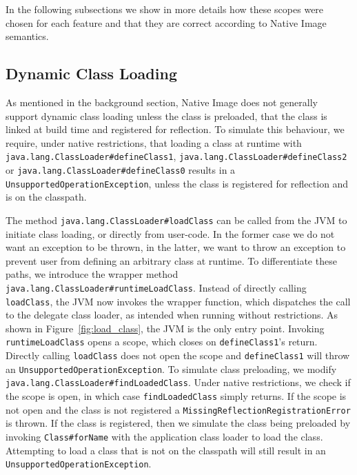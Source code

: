 In the following subsections we show in more details how these scopes were chosen for each feature and that they are correct according to Native Image semantics.

\subsection{Dynamic Class Loading}
As mentioned in the background section, Native Image does not generally support dynamic class loading unless the class is preloaded, that the class is linked at build time and registered for reflection.
To simulate this behaviour, we require, under native restrictions, that loading a class at runtime with \verb|java.lang.ClassLoader#defineClass1|, \verb|java.lang.ClassLoader#defineClass2| or \verb|java.lang.ClassLoader#defineClass0| results in a \verb|UnsupportedOperationException|, unless the class is registered for reflection and is on the classpath.

The method \verb|java.lang.ClassLoader#loadClass| can be called from the JVM to initiate class loading, or directly from user-code. In the former case we do not want an exception to be thrown, in the latter, we want to throw an exception to prevent user from defining an arbitrary class at runtime.
To differentiate these paths, we introduce the wrapper method \verb|java.lang.ClassLoader#runtimeLoadClass|. Instead of directly calling \verb|loadClass|, the JVM now invokes the wrapper function, which dispatches the call to the delegate class loader, as intended when running without restrictions. As shown in Figure~\ref{fig:load_class}, the JVM is the only entry point.
Invoking \verb|runtimeLoadClass| opens a scope, which closes on \verb|defineClass1|'s return.
Directly calling \verb|loadClass| does not open the scope and \verb|defineClass1| will throw an \verb|UnsupportedOperationException|.
To simulate class preloading, we modify \verb|java.lang.ClassLoader#findLoadedClass|.
Under native restrictions, we check if the scope is open, in which case \verb|findLoadedClass| simply returns. If the scope is not open and the class is not registered a \verb|MissingReflectionRegistrationError| is thrown.
If the class is registered, then we simulate the class being preloaded by invoking \verb|Class#forName| with the application class loader to load the class. Attempting to load a class that is not on the classpath will still result in an \verb|UnsupportedOperationException|.

